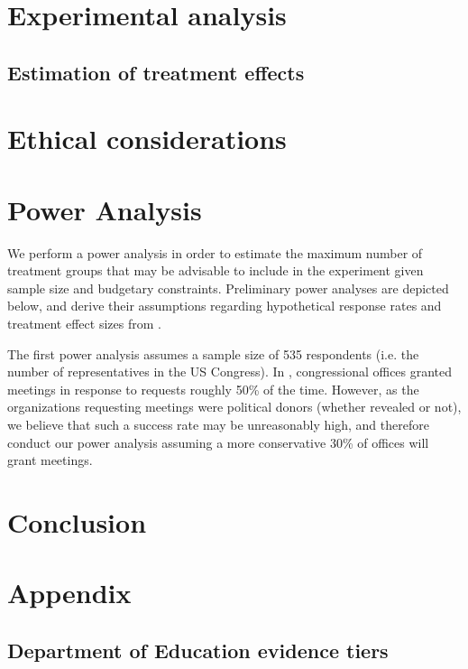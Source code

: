 \documentclass[12pt,final,fleqn]{article}
\theoremstyle{plain}
\begin{document}
\section{Experimental analysis} \label{sec:analysis}

\subsection{Estimation of treatment effects} \label{sec:treatment_effects}



\section{Ethical considerations} \label{sec:Ethics}



\section{Power Analysis} \label{sec:Power}

We perform a power analysis in order to estimate the maximum number of treatment groups that may be advisable to include in the experiment given sample size and budgetary constraints. Preliminary power analyses are depicted below, and derive their assumptions regarding hypothetical response rates and treatment effect sizes from \citet{kalla2016campaign}.

The first power analysis assumes a sample size of 535 respondents (i.e. the number of representatives in the US Congress). In \citet{kalla2016campaign}, congressional offices granted meetings in response to requests roughly 50\% of the time. However, as the organizations requesting meetings were political donors (whether revealed or not), we believe that such a success rate may be unreasonably high, and therefore conduct our power analysis assuming a more conservative 30\% of offices will grant meetings.


\section{Conclusion} \label{sec:Conclusion}


\clearpage
\pagebreak


\pagebreak

\appendix
\setcounter{table}{0}
\setcounter{figure}{0}
\renewcommand\thetable{\Alph{section}.\arabic{table}}
\renewcommand\thefigure{\Alph{section}.\arabic{figure}}
\section{Appendix} \label{Appendix}

\subsection{Department of Education evidence tiers} \label{sec: DoE}
\end{document}

